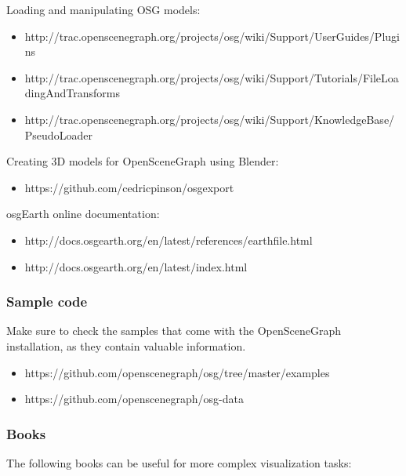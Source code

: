 Loading and manipulating OSG models:
\begin{itemize}
\item http://trac.openscenegraph.org/projects/osg/wiki/Support/UserGuides/Plugins
\item http://trac.openscenegraph.org/projects/osg/wiki/Support/Tutorials/FileLoadingAndTransforms
\item http://trac.openscenegraph.org/projects/osg/wiki/Support/KnowledgeBase/PseudoLoader
\end{itemize}

Creating 3D models for OpenSceneGraph using Blender:
\begin{itemize}
\item https://github.com/cedricpinson/osgexport
\end{itemize}

osgEarth online documentation:
\begin{itemize}
\item http://docs.osgearth.org/en/latest/references/earthfile.html
\item http://docs.osgearth.org/en/latest/index.html
\end{itemize}

\subsubsection{Sample code}
\label{sec:graphics:osg-osgearth-samples}

Make sure to check the samples that come with the OpenSceneGraph installation,
as they contain valuable information.

\begin{itemize}
\item https://github.com/openscenegraph/osg/tree/master/examples
\item https://github.com/openscenegraph/osg-data
\end{itemize}

\subsubsection{Books}
\label{sec:graphics:osg-osgearth-books}

The following books can be useful for more complex visualization tasks:


